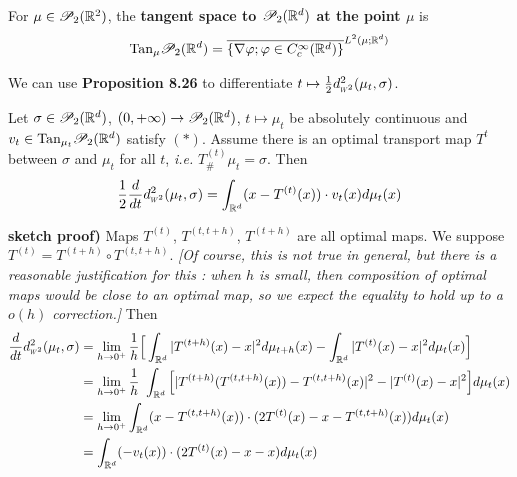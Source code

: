 \documentclass[12pt,a4paper]{article}
\newenvironment{proof}
{\begin{changemargin}{1cm}{0.5cm} 
	}%
	{\end{changemargin}
}
\newenvironment{p}
{\begin{proof} 
	}%
	{\end{proof}
}
\begin{document}
 For $\mu\in \mathscr{P}_2(\mathbb{R}^2)$, the \textbf{tangent space to $\mathscr{P}_2(\mathbb{R}^d)$ at the point $\mu$} is
\begin{align*}
\text{Tan}_{\mu} \mathscr{P}_2(\mathbb{R}^d) = \overline{ \{ \nabla \varphi ; \varphi \in C_c^{\infty}(\mathbb{R}^d)\}}^{L^2(\mu ; \mathbb{R}^d)}
\end{align*}
\s

We can use \textbf{Proposition 8.26} to differentiate $t\mapsto \frac{1}{2} \wa{2}^2(\mu_t, \sigma)$.
\s

 Let $\sigma \in \mathscr{P}_2(\mathbb{R}^d)$, $(0, + \infty) \rightarrow \mathscr{P}_2(\mathbb{R}^d)$, $t\mapsto \mu_t$ be absolutely continuous and $v_t \in \text{Tan}_{\mu_t} \mathscr{P}_2(\mathbb{R}^d)$ satisfy $(*)$. Assume there is an optimal transport map $T^{t}$ between $\sigma$ and $\mu_t$ for all $t$, \textit{i.e.} $T^{(t)}_{\#} \mu_t =\sigma$. Then
\begin{align*}
\frac{1}{2} \frac{d}{dt} \wa{2}^2 (\mu_t, \sigma) = \int_{\reals^d}(x- T^{(t)}(x))\cdot v_t(x) d\mu_t(x)
\end{align*}
\begin{p}
\textbf{sketch proof)} Maps $T^{(t)}$, $T^{(t, t+h)}$, $T^{(t+h)}$ are all optimal maps. We suppose $T^{(t)} = T^{(t+h)} \circ T^{(t, t+h)}$. \emph{[Of course, this is not true in general, but there is a reasonable justification for this : when $h$ is small, then composition of optimal maps would be close to an optimal map, so we expect the equality to hold up to a $o(h)$ correction.]} Then
\begin{align*}
\frac{d}{dt} \wa{2}^2 (\mu_t, \sigma) &= \lim_{h\rightarrow 0^+} \frac{1}{h} \Big[ \int_{\reals^d} |T^{(t+h)}(x) -x|^2  d\mu_{t+h}(x) - \int_{\reals^d} |T^{(t)}(x) - x|^2 d\mu_t(x) \Big] \\
&= \lim_{h\rightarrow 0^+} \frac{1}{h}  \ \int_{\reals^d} \Big[ | T^{(t+h)}(T^{(t, t+h)}(x)) - T^{(t, t+h)}(x) |^2 - |T^{(t)} (x) - x|^2  \Big] d\mu_t(x) \\
&= \lim_{h\rightarrow 0^+} \int_{\reals^d} (x- T^{(t, t+h)}(x)) \cdot (2T^{(t)}(x) - x - T^{(t, t+h)}(x)) d\mu_t(x) \\
&= \int_{\reals^d} (-v_t(x)) \cdot (2T^{(t)}(x) - x - x) d\mu_t(x)
\end{align*}
\eop
\end{p}
\end{document}
